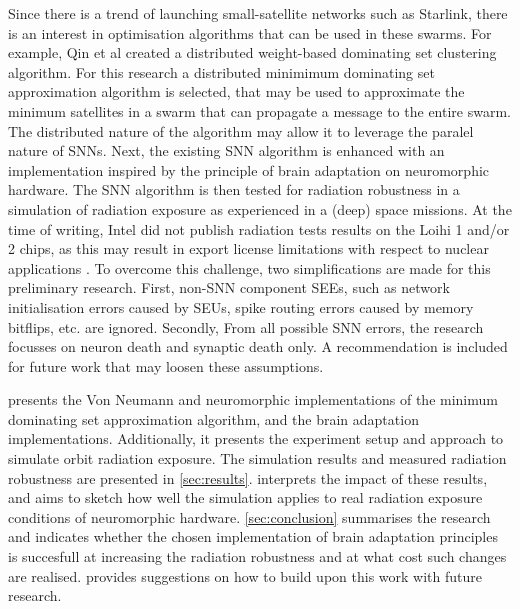 Since there is a trend of launching small-satellite networks such as Starlink, there is an interest in optimisation algorithms that can be used in these swarms. For example, Qin et al created a distributed weight-based dominating set clustering algorithm. For this research a distributed minimimum dominating set approximation algorithm is selected, that may be used to approximate the minimum satellites in a swarm that can propagate a message to the entire swarm. The distributed nature of the algorithm may allow it to leverage the paralel nature of SNNs.
Next, the existing SNN algorithm is enhanced with an implementation inspired by the principle of brain adaptation on neuromorphic hardware. The SNN algorithm is then tested for radiation robustness in a simulation of radiation exposure as experienced in a (deep) space missions. At the time of writing, Intel did not publish radiation tests results on the Loihi 1 and/or 2 chips, as this may result in export license limitations with respect to nuclear applications \cite{INRC_meeting}. To overcome this challenge, two simplifications are made for this preliminary research. First, non-SNN component SEEs, such as network initialisation errors caused by SEUs, spike routing errors caused by memory bitflips, etc. are ignored. Secondly, From all possible SNN errors, the research focusses on neuron death and synaptic death only. A recommendation is included for future work that may loosen these assumptions.



 presents the Von Neumann and neuromorphic implementations of the minimum dominating set approximation algorithm, and the brain adaptation implementations. Additionally, it presents the experiment setup and approach to simulate orbit radiation exposure. The simulation results and measured radiation robustness are presented in \cref{sec:results}.  interprets the impact of these results, and aims to sketch how well the simulation applies to real radiation exposure conditions of neuromorphic hardware. \cref{sec:conclusion} summarises the research and indicates whether the chosen implementation of brain adaptation principles is succesfull at increasing the radiation robustness and at what cost such changes are realised. provides suggestions on how to build upon this work with future research.